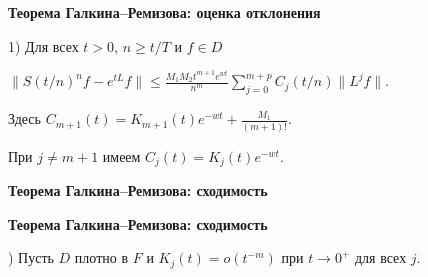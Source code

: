 \documentclass[11pt]{article}
\begin{document}
\newpage

\begin{center}
{\color{notaeYELLOW}\bfseries\fontsize{44}{52}\selectfont Теорема Галкина--Ремизова: оценка отклонения}
\end{center}
\vspace*{\fill}
\begin{center}
\fontsize{36}{43}\selectfont
\parbox{\linewidth}{\centering{} 1) Для всех $t>0$, $n\ge t/T$ и $f\in D$
\par}\vspace{0.4in}
\parbox{\linewidth}{\centering\noindent $\bigl\|S(t/n)^n f-e^{tL}f\bigr\|\le\frac{M_1M_2t^{m+1}e^{wt}}{n^m}\sum\limits_{j=0}^{m+p}C_j(t/n)\|L^jf\|.$
\par}\vspace{0.4in}
\parbox{\linewidth}{\centering\noindent Здесь $C_{m+1}(t)=K_{m+1}(t)e^{-wt}+\frac{M_1}{(m+1)!}$.
\par}\vspace{0.4in}
\parbox{\linewidth}{\centering\noindent При $j\ne m+1$ имеем $C_j(t)=K_j(t)e^{-wt}$.
\par}\vspace{0.4in}
\end{center}
\vspace*{\fill}

\newpage

\begin{center}
{\color{notaeYELLOW}\bfseries\fontsize{44}{52}\selectfont Теорема Галкина--Ремизова: сходимость}
\end{center}
\vspace*{\fill}
\begin{center}
\fontsize{36}{43}\selectfont
\end{center}
\vspace*{\fill}

\newpage

\begin{center}
{\color{notaeYELLOW}\bfseries\fontsize{44}{52}\selectfont Теорема Галкина--Ремизова: сходимость}
\end{center}
\vspace*{\fill}
\begin{center}
\fontsize{36}{43}\selectfont
\parbox{\linewidth}{\centering{}) Пусть $D$ плотно в $F$ и $K_j(t)=o(t^{-m})$ при $t\to0^+$ для всех $j$.
\par}\vspace{0.4in}
\end{center}
\vspace*{\fill}
\end{document}
